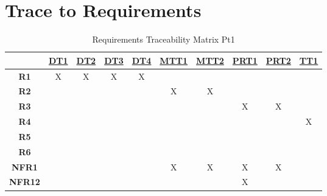 \documentclass[12pt, titlepage]{article}
\begin{document}
\section{Trace to Requirements}

\noindent
\begin{table}[H]
  \centering
  \begin{tabular}{|c|c|c|c|c|c|c|c|c|c|}
    \hline
                   & \hyperref[DT1]{DT1} & \hyperref[DT2]{DT2} & \hyperref[DT3]{DT3} & \hyperref[DT4]{DT4} & \hyperref[MTT1]{MTT1} & \hyperref[MTT2]{MTT2} & \hyperref[PRT1]{PRT1} & \hyperref[PRT2]{PRT2} & \hyperref[TT1]{TT1} \\
    \hline
    \textbf{R1}    & X                   & X                   & X                   & X                   &                       &                       &                       &                       &                     \\ \hline
    \textbf{R2}    &                     &                     &                     &                     & X                     & X                     &                       &                       &                     \\ \hline
    \textbf{R3}    &                     &                     &                     &                     &                       &                       & X                     & X                     &                     \\ \hline
    \textbf{R4}    &                     &                     &                     &                     &                       &                       &                       &                       & X                   \\ \hline
    \textbf{R5}    &                     &                     &                     &                     &                       &                       &                       &                       &                     \\ \hline
    \textbf{R6}    &                     &                     &                     &                     &                       &                       &                       &                       &                     \\ \hline
    \textbf{NFR1}  &                     &                     &                     &                     & X                     & X                     & X                     & X                     &                     \\ \hline
    \textbf{NFR12} &                     &                     &                     &                     &                       &                       & X                     &                       &                     \\ \hline
  \end{tabular}
  \caption{ Requirements Traceability Matrix Pt1}
  \label{Table:A_Req_trace}
\end{table}
\end{document}
